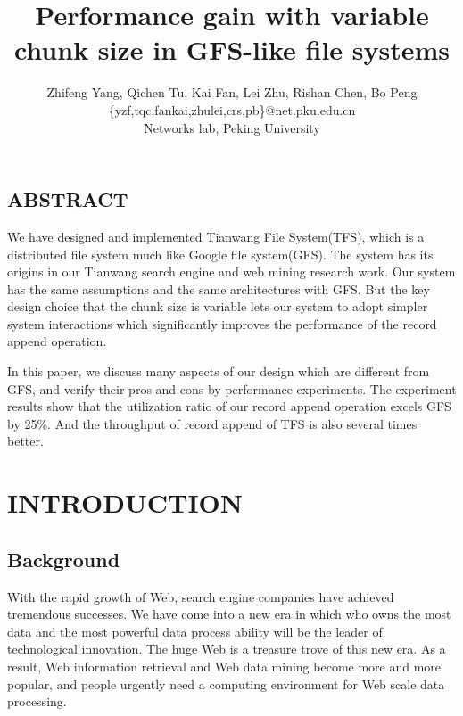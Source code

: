 \documentclass[letterpaper,twocolumn,10pt]{article}
\begin{document}
\date{}

\title{\Large \textbf Performance gain with variable chunk size in GFS-like file systems}

\author{
{\rm Zhifeng Yang, Qichen Tu, Kai Fan, Lei Zhu, Rishan Chen, Bo Peng}\\
\{yzf,tqc,fankai,zhulei,crs,pb\}@net.pku.edu.cn\\
Networks lab, Peking University
} %

\maketitle

\thispagestyle{empty}


\subsection*{ABSTRACT}
We have designed and implemented Tianwang File System(TFS), which is a distributed file system much like Google file system(GFS). The system has its origins in our Tianwang search engine and web mining research work. Our system has the same assumptions and the same architectures with GFS. But the key design choice that the chunk size is variable lets our system to adopt simpler system interactions which significantly improves the performance of the record append operation. 

In this paper, we discuss many aspects of our design which are different from GFS, and verify their pros and cons by performance experiments. The experiment results show that the utilization ratio of our record append operation excels GFS by 25\%. And the throughput of record append of TFS is also several times better. 
\section{INTRODUCTION}
\subsection{Background}
With the rapid growth of Web, search engine companies have achieved tremendous successes. We have come into a new era in which who owns the most data and the most powerful data process ability will be the leader of technological innovation. The huge Web is a treasure trove of this new era. As a result, Web information retrieval and Web data mining become more and more popular, and people urgently need a computing environment for Web scale data processing.
\end{document}
